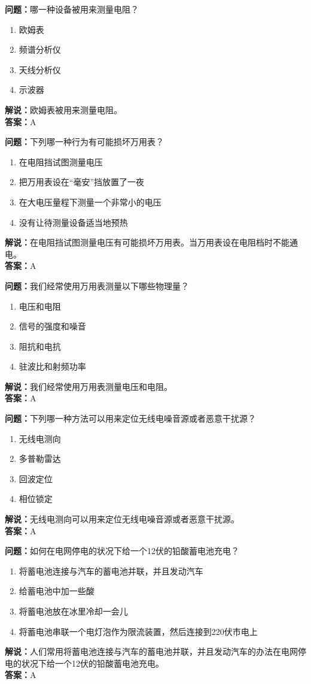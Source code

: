 \documentclass{ctexbook}%
\begin{document}
\textbf{问题：}哪一种设备被用来测量电阻？
\begin{enumerate}[label=\Alph*), leftmargin=3em]
\item 欧姆表
\item 频谱分析仪
\item 天线分析仪
\item 示波器
\end{enumerate}
\textbf{解说：}欧姆表被用来测量电阻。\\
\textbf{答案：}A

\textbf{问题：}下列哪一种行为有可能损坏万用表？
\begin{enumerate}[label=\Alph*), leftmargin=3em]
\item 在电阻挡试图测量电压
\item 把万用表设在“毫安”挡放置了一夜
\item 在大电压量程下测量一个非常小的电压
\item 没有让待测量设备适当地预热
\end{enumerate}
\textbf{解说：}在电阻挡试图测量电压有可能损坏万用表。当万用表设在电阻档时不能通电。\\
\textbf{答案：}A

\textbf{问题：}我们经常使用万用表测量以下哪些物理量？
\begin{enumerate}[label=\Alph*), leftmargin=3em]
\item 电压和电阻
\item 信号的强度和噪音
\item 阻抗和电抗
\item 驻波比和射频功率
\end{enumerate}
\textbf{解说：}我们经常使用万用表测量电压和电阻。\\
\textbf{答案：}A

\textbf{问题：}下列哪一种方法可以用来定位无线电噪音源或者恶意干扰源？
\begin{enumerate}[label=\Alph*), leftmargin=3em]
\item 无线电测向
\item 多普勒雷达
\item 回波定位
\item 相位锁定
\end{enumerate}
\textbf{解说：}无线电测向可以用来定位无线电噪音源或者恶意干扰源。\\
\textbf{答案：}A

\textbf{问题：}如何在电网停电的状况下给一个12伏的铅酸蓄电池充电？
\begin{enumerate}[label=\Alph*), leftmargin=3em]
\item 将蓄电池连接与汽车的蓄电池并联，并且发动汽车
\item 给蓄电池中加一些酸
\item 将蓄电池放在冰里冷却一会儿
\item 将蓄电池串联一个电灯泡作为限流装置，然后连接到220伏市电上
\end{enumerate}
\textbf{解说：}人们常用将蓄电池连接与汽车的蓄电池并联，并且发动汽车的办法在电网停电的状况下给一个12伏的铅酸蓄电池充电。\\
\textbf{答案：}A
\end{document}
